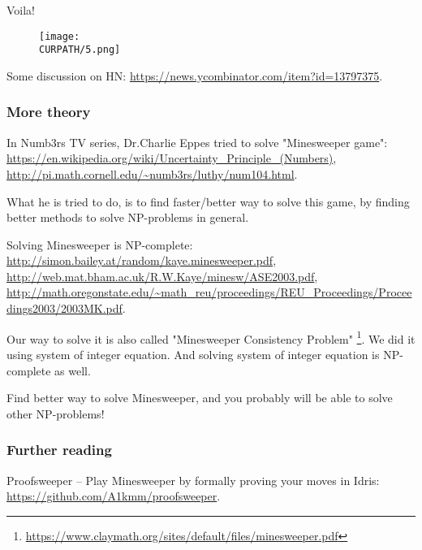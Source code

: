 Voila!

\begin{figure}[H]
\centering
\texttt{[image: \\CURPATH/5.png]}
\end{figure}

Some discussion on HN: \url{https://news.ycombinator.com/item?id=13797375}.

\subsubsection{More theory}

In Numb3rs TV series, Dr.Charlie Eppes tried to solve "Minesweeper game":
\url{https://en.wikipedia.org/wiki/Uncertainty_Principle_(Numbers)},
\url{http://pi.math.cornell.edu/~numb3rs/luthy/num104.html}.

What he is tried to do, is to find faster/better way to solve this game, by finding better methods to solve NP-problems in general.

Solving Minesweeper is NP-complete:
\url{http://simon.bailey.at/random/kaye.minesweeper.pdf},
\url{http://web.mat.bham.ac.uk/R.W.Kaye/minesw/ASE2003.pdf},
\url{http://math.oregonstate.edu/~math_reu/proceedings/REU_Proceedings/Proceedings2003/2003MK.pdf}.

Our way to solve it is also called "Minesweeper Consistency Problem"
\footnote{\url{https://www.claymath.org/sites/default/files/minesweeper.pdf}}.
We did it using system of integer equation.
And solving system of integer equation is NP-complete as well.

Find better way to solve Minesweeper, and you probably will be able to solve other NP-problems!

\subsubsection{Further reading}

Proofsweeper -- Play Minesweeper by formally proving your moves in Idris: \url{https://github.com/A1kmm/proofsweeper}.

